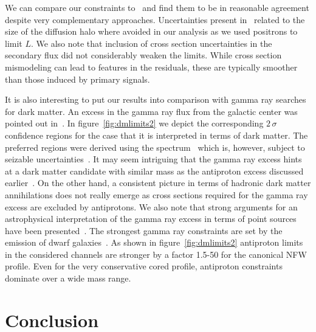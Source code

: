 \documentclass[a4paper,11pt]{article}
\begin{document}
We can compare our constraints to~\cite{Cuoco:2016eej,Cui:2016ppb} and find them to be in reasonable agreement despite very complementary approaches. Uncertainties present in~\cite{Cuoco:2016eej,Cui:2016ppb} related to the size of the diffusion halo where avoided in our analysis as we used positrons to limit $L$. We also note that inclusion of cross section uncertainties in the secondary flux did not considerably weaken the limits. While cross section mismodeling can lead to features in the residuals, these are typically smoother than those induced by primary signals.


It is also interesting to put our results into comparison with gamma ray searches for dark matter. An excess in the gamma ray flux from the galactic center was pointed out in~\cite{Goodenough:2009gk}. In figure~\ref{fig:dmlimits2} we depict the corresponding $2\,\sigma$ confidence regions for the case that it is interpreted in terms of dark matter. The preferred regions were derived using the spectrum~\cite{Krauss:2016cdi} which is, however, subject to seizable uncertainties~\cite{TheFermi-LAT:2017vmf}. It may seem intriguing that the gamma ray excess hints at a dark matter candidate with similar mass as the antiproton excess discussed earlier~\cite{Cuoco:2017rxb}. On the other hand, a consistent picture in terms of hadronic dark matter annihilations does not really emerge as cross sections required for the gamma ray excess are excluded by antiprotons. We also note that strong arguments for an astrophysical interpretation of the gamma ray excess in terms of point sources have been presented~\cite{Bartels:2015aea,Lee:2015fea,Fermi-LAT:2017yoi}. The strongest gamma ray constraints are set by the emission of dwarf galaxies~\cite{Ackermann:2015zua,Fermi-LAT:2016uux}. As shown in figure~\ref{fig:dmlimits2} antiproton limits in the considered channels are stronger by a factor 1.5-50 for the canonical NFW profile. Even for the very conservative cored profile, antiproton constraints dominate over a wide mass range. 

\section{Conclusion}
\end{document}
